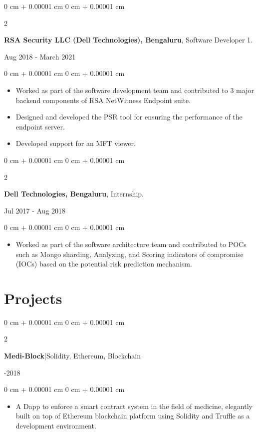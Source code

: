 \documentclass[10pt, letterpaper]{article}
\newenvironment{highlights}{
    \begin{itemize}[
        topsep=0.10 cm,
        parsep=0.10 cm,
        partopsep=0pt,
        itemsep=0pt,
        leftmargin=0 cm + 10pt
    ]
}{
    \end{itemize}
} %
\newenvironment{onecolentry}{
    \begin{adjustwidth}{
        0 cm + 0.00001 cm
    }{
        0 cm + 0.00001 cm
    }
}{
    \end{adjustwidth}
} %
\newenvironment{twocolentry}[2][]{
    \onecolentry
    \def\secondColumn{#2}
    \setcolumnwidth{\fill, 4.5 cm}
    \begin{paracol}{2}
}{
    \switchcolumn \raggedleft \secondColumn
    \end{paracol}
    \endonecolentry
} %
\begin{document}
        \vspace{0.2 cm}

        \begin{twocolentry}{Aug 2018 - March 2021}
         \textbf{RSA Security LLC (Dell Technologies), Bengaluru}, Software Developer 1.
        \end{twocolentry}
        \vspace{0.10 cm}
        \begin{onecolentry}
          \begin{highlights}
             \item Worked as part of the software development team and contributed to 3 major backend components of RSA NetWitness Endpoint suite.
                \item Designed and developed the PSR tool for ensuring the performance of the endpoint server.
             \item Developed support for an MFT viewer.
         \end{highlights}
        \end{onecolentry}

        \vspace{0.2 cm}

        \begin{twocolentry}{Jul 2017 - Aug 2018}
            \textbf{Dell Technologies, Bengaluru}, Internship.
        \end{twocolentry}
        \vspace{0.10 cm}
        \begin{onecolentry}
          \begin{highlights}
              \item Worked as part of the software architecture team and contributed to POCs such as Mongo sharding, Analyzing, and Scoring indicators of compromise (IOCs) based on the potential risk prediction mechanism.
            \end{highlights}
        \end{onecolentry}


    \section{Projects}

        \begin{twocolentry}{2017-2018}
            \textbf{Medi-Block}|Solidity, Ethereum, Blockchain
        \end{twocolentry}
        \begin{onecolentry}
          \begin{highlights}
                \item A Dapp to enforce a smart contract system in the field of medicine, elegantly built on top of Ethereum blockchain platform using Solidity and Truffle as a development environment.
         \end{highlights}
        \end{onecolentry}
\end{document}
